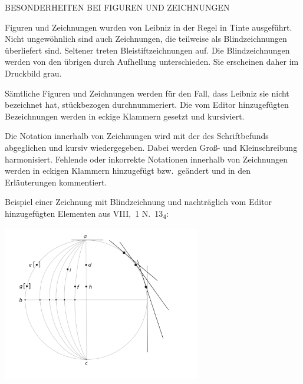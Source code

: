 \newpage
\par
\noindent\uppercase{Besonderheiten bei Figuren und Zeichnungen}\par\vspace{1.0ex}
\noindent
Figuren und Zeichnungen wurden von Leibniz in der Regel in Tinte aus\-geführt. Nicht ungewöhnlich sind auch Zeichnungen, die teilweise als Blind\-zeichnungen überliefert sind. Seltener treten Bleistiftzeichnungen auf. Die Blind\-zeichnungen werden von den übrigen durch Aufhellung unterschieden. Sie erscheinen daher im Druckbild grau.\par
Sämtliche Figuren und Zeichnungen werden für den Fall, dass Leibniz sie nicht bezeichnet hat, stückbezogen durchnummeriert. Die vom Editor hinzugefügten Bezeichnungen werden in eckige Klammern gesetzt und kursiviert.\par
Die Notation innerhalb von Zeichnungen wird mit der des Schriftbefunds abgeglichen und kursiv wiedergegeben. Dabei werden Groß- und Kleinschreibung harmonisiert. Fehlende oder inkorrekte Notationen innerhalb von Zeichnungen werden in eckigen Klammern hinzugefügt bzw.\ geändert und in den Erläuterungen kommentiert.\par
Beispiel einer Zeichnung mit Blindzeichnung und nachträglich vom Editor hinzugefügten Elementen aus VIII,~1 N.~13\textsubscript{4}: 
\begin{center}
  \includegraphics[trim = 0mm 0mm 0mm -15mm, clip,width=0.65\textwidth]{images/38_21v.pdf}
\end{center}
\clearpage